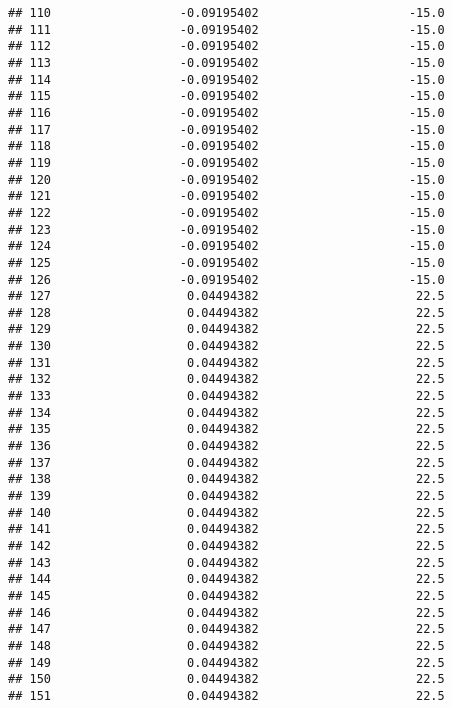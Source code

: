 \documentclass[]{article}
\begin{document}
\begin{verbatim}
## 110                  -0.09195402                     -15.0
## 111                  -0.09195402                     -15.0
## 112                  -0.09195402                     -15.0
## 113                  -0.09195402                     -15.0
## 114                  -0.09195402                     -15.0
## 115                  -0.09195402                     -15.0
## 116                  -0.09195402                     -15.0
## 117                  -0.09195402                     -15.0
## 118                  -0.09195402                     -15.0
## 119                  -0.09195402                     -15.0
## 120                  -0.09195402                     -15.0
## 121                  -0.09195402                     -15.0
## 122                  -0.09195402                     -15.0
## 123                  -0.09195402                     -15.0
## 124                  -0.09195402                     -15.0
## 125                  -0.09195402                     -15.0
## 126                  -0.09195402                     -15.0
## 127                   0.04494382                      22.5
## 128                   0.04494382                      22.5
## 129                   0.04494382                      22.5
## 130                   0.04494382                      22.5
## 131                   0.04494382                      22.5
## 132                   0.04494382                      22.5
## 133                   0.04494382                      22.5
## 134                   0.04494382                      22.5
## 135                   0.04494382                      22.5
## 136                   0.04494382                      22.5
## 137                   0.04494382                      22.5
## 138                   0.04494382                      22.5
## 139                   0.04494382                      22.5
## 140                   0.04494382                      22.5
## 141                   0.04494382                      22.5
## 142                   0.04494382                      22.5
## 143                   0.04494382                      22.5
## 144                   0.04494382                      22.5
## 145                   0.04494382                      22.5
## 146                   0.04494382                      22.5
## 147                   0.04494382                      22.5
## 148                   0.04494382                      22.5
## 149                   0.04494382                      22.5
## 150                   0.04494382                      22.5
## 151                   0.04494382                      22.5

\end{verbatim}
\end{document}
